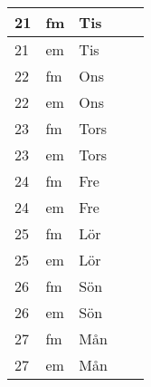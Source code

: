 \documentclass[a4paper]{article}
\begin{document}
\begin{table}[ht!]
\begin{tabular}{lllp{7cm}p{7cm}}
\multicolumn{1}{|l|}{21} & \multicolumn{1}{l|}{fm} & \multicolumn{1}{l|}{Tis} & \multicolumn{1}{l|}{} & \multicolumn{1}{l|}{} \\ \hline
\multicolumn{1}{|l|}{21} & \multicolumn{1}{l|}{em} & \multicolumn{1}{l|}{Tis} & \multicolumn{1}{l|}{} & \multicolumn{1}{l|}{} \\ \hline    

\multicolumn{1}{|l|}{22} & \multicolumn{1}{l|}{fm} & \multicolumn{1}{l|}{Ons} & \multicolumn{1}{l|}{} & \multicolumn{1}{l|}{} \\ \hline
\multicolumn{1}{|l|}{22} & \multicolumn{1}{l|}{em} & \multicolumn{1}{l|}{Ons} & \multicolumn{1}{l|}{} & \multicolumn{1}{l|}{} \\ \hline    

\multicolumn{1}{|l|}{23} & \multicolumn{1}{l|}{fm} & \multicolumn{1}{l|}{Tors} & \multicolumn{1}{l|}{} & \multicolumn{1}{l|}{} \\ \hline
\multicolumn{1}{|l|}{23} & \multicolumn{1}{l|}{em} & \multicolumn{1}{l|}{Tors} & \multicolumn{1}{l|}{} & \multicolumn{1}{l|}{} \\ \hline    

\multicolumn{1}{|l|}{24} & \multicolumn{1}{l|}{fm} & \multicolumn{1}{l|}{Fre} & \multicolumn{1}{l|}{} & \multicolumn{1}{l|}{} \\ \hline
\multicolumn{1}{|l|}{24} & \multicolumn{1}{l|}{em} & \multicolumn{1}{l|}{Fre} & \multicolumn{1}{l|}{} & \multicolumn{1}{l|}{} \\ \hline    

\multicolumn{1}{|l|}{25} & \multicolumn{1}{l|}{fm} & \multicolumn{1}{l|}{Lör} & \multicolumn{1}{l|}{} & \multicolumn{1}{l|}{} \\ \hline
\multicolumn{1}{|l|}{25} & \multicolumn{1}{l|}{em} & \multicolumn{1}{l|}{Lör} & \multicolumn{1}{l|}{} & \multicolumn{1}{l|}{} \\ \hline    

\multicolumn{1}{|l|}{26} & \multicolumn{1}{l|}{fm} & \multicolumn{1}{l|}{Sön} & \multicolumn{1}{l|}{} & \multicolumn{1}{l|}{} \\ \hline
\multicolumn{1}{|l|}{26} & \multicolumn{1}{l|}{em} & \multicolumn{1}{l|}{Sön} & \multicolumn{1}{l|}{} & \multicolumn{1}{l|}{} \\ \hline    

\multicolumn{1}{|l|}{27} & \multicolumn{1}{l|}{fm} & \multicolumn{1}{l|}{Mån} & \multicolumn{1}{l|}{} & \multicolumn{1}{l|}{} \\ \hline
\multicolumn{1}{|l|}{27} & \multicolumn{1}{l|}{em} & \multicolumn{1}{l|}{Mån} & \multicolumn{1}{l|}{} & \multicolumn{1}{l|}{} \\ \hline    


\end{tabular}
\end{table}
\end{document}
